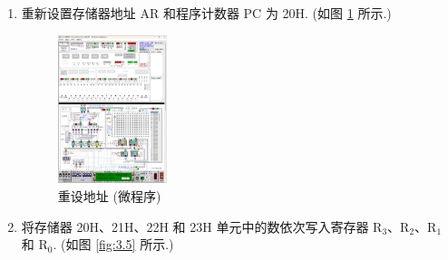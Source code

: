 \documentclass[../main.tex]{subfiles}
\begin{document}
\begin{enumerate}
    \item 重新设置存储器地址 AR 和程序计数器 PC 为 20H. (如图 \ref{fig:3.4} 所示.)

          \begin{figure}[htbp]
              \centering
              \includegraphics[width=0.3\textwidth]{screenshots/3.1.10.png}
              \caption{重设地址 (微程序)}
              \label{fig:3.4}
          \end{figure}

    \item 将存储器 20H、21H、22H 和 23H 单元中的数依次写入寄存器 R$_3$、R$_2$、R$_1$ 和 R$_0$. (如图 \ref{fig:3.5} 所示.)


\end{enumerate}
\end{document}
